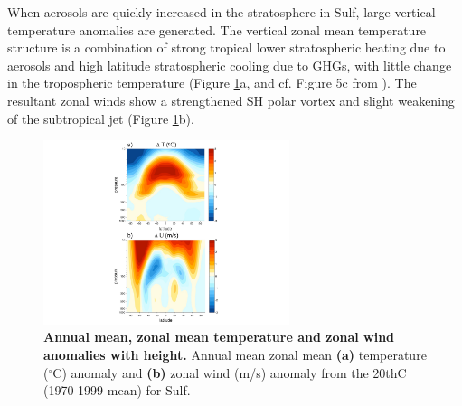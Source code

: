\documentclass[grl]{AGUTeX}  %
\begin{document}
\begin{article}
When aerosols are quickly increased in the stratosphere in Sulf, large vertical temperature anomalies are generated. The vertical zonal mean temperature structure is a combination of strong tropical lower stratospheric heating due to aerosols \citep{ferraro11} and high latitude stratospheric cooling due to GHGs, with little change in the tropospheric temperature (Figure \ref{fig:vert}a, and cf. Figure 5c from \citet{mccusker12}). The resultant zonal winds show a strengthened SH polar vortex and slight weakening of the subtropical jet (Figure \ref{fig:vert}b). %

\begin{figure}[htbp] %
\centering
 \noindent\includegraphics[width=17pc]{figures/verticalU_T_v20thC2.pdf}  %
\caption{\textbf{Annual mean, zonal mean temperature and zonal wind anomalies with height.} Annual mean zonal mean \textbf{(a)} temperature ($^\circ$C) anomaly and \textbf{(b)} zonal wind (m/s) anomaly from the 20thC (1970-1999 mean) for Sulf.}
\label{fig:vert}
\end{figure}


\end{article}
\end{document}
